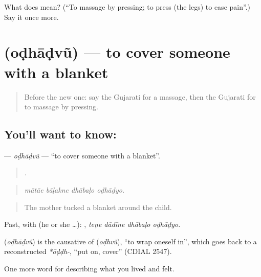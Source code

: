 \begin{tcolorbox}[breakable,colback=teal!4,colframe=teal!35!black,title={Before you move on}]
What does  mean? (\textquotedblleft{}To massage by pressing; to press (the legs) to ease pain\textquotedblright{}.) Say it once more.
\end{tcolorbox}
\section[\texorpdfstring{\gu{ઓઢાડવું} (oḍhāḍvũ)}{ઓઢાડવું (oḍhāḍvũ)}]{ (oḍhāḍvũ) — to cover someone with a blanket}

\label{lesson:GU-C487-odhadvu}



\begin{quote}
Before the new one: say the Gujarati for a massage, then the Gujarati for to massage by pressing.
\end{quote}

\subsection*{You'll want to know: }
\textbf{} — \emph{oḍhāḍvũ} — \textquotedblleft{}to cover someone with a blanket\textquotedblright{}.

\begin{quote}
   .
\end{quote}

\begin{quote}
\emph{mātāe bāḷakne dhābaḷo oḍhāḍyo.}
\end{quote}

\begin{quote}
The mother tucked a blanket around the child.
\end{quote}

Past, with  (he or she …):    , \emph{teṇe dādīne dhābaḷo oḍhāḍyo}.

\begin{cousinweb}
\textbf{} (\emph{oḍhāḍvũ}) is the causative of \textbf{} (\emph{oḍhvũ}), \textquotedblleft{}to wrap oneself in\textquotedblright{}, which goes back to a reconstructed \emph{*ōḍḍh-}, \textquotedblleft{}put on, cover\textquotedblright{} (CDIAL 2547).
\end{cousinweb}

\begin{grammarlens}[title={What you've built}]
One more word for describing what you lived and felt.
\end{grammarlens}

